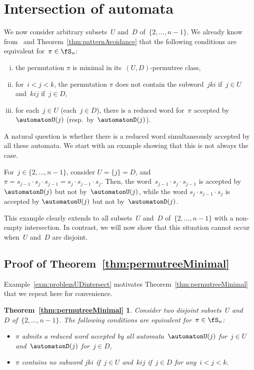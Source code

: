 \section{Intersection of automata}\label{sec:intersectionsAutomata}

We now consider arbitrary subsets~$U$ and~$D$ of~$\{2, \dots, n-1\}$.
We already know from~\cite{PilaudPons-permutrees} and Theorem~\ref{thm:patternAvoidance} that the following conditions are equivalent for~$\pi \in \fS_n$:
\begin{enumerate}[(i)]
	\item the permutation $\pi$ is minimal in its~$(U,D)$-permutree class, 
	\item for~$i < j < k$, the permutation $\pi$ does not contain the subword~$jki$ if~$j \in U$ and~$kij$ if~$j \in D$,
	\item for each~$j \in U$ (each~$j \in D$), there is a reduced word for~$\pi$ accepted by~$\automatonU(j)$ (resp.~by~$\automatonD(j)$).
\end{enumerate}
A natural question is whether there is a reduced word simultaneously accepted by all these automata.
We start with an example showing that this is not always the case.

\begin{example}\label{exm:problemUDintersect}
For~$j \in \{2, \dots, n-1\}$, consider $U = \{j\} = D$, and~$\pi = s_{j-1} \cdot s_j \cdot s_{j-1} = s_j \cdot s_{j-1} \cdot s_j$.
Then, the word~$s_{j-1} \cdot s_j \cdot s_{j-1}$ is accepted by $\automatonD(j)$ but not by~$\automatonU(j)$, while the word $s_j \cdot s_{j-1} \cdot s_j$ is accepted by $\automatonU(j)$ but not by~$\automatonD(j)$.
\end{example}

This example clearly extends to all subsets~$U$ and~$D$ of~$\{2, \dots, n-1\}$ with a non-empty intersection.
In contrast, we will now show that this situation cannot occur when~$U$ and~$D$ are disjoint.

\subsection{Proof of Theorem~\ref{thm:permutreeMinimal}}

Example~\ref{exm:problemUDintersect} motivates Theorem~\ref{thm:permutreeMinimal} that we repeat here for convenience.

\newtheorem*{thm:permutreeMinimal}{Theorem~\ref{thm:permutreeMinimal}}
\begin{thm:permutreeMinimal}
Consider two disjoint subsets~$U$ and~$D$ of~$\{2, \dots, n-1\}$.
The following conditions are equivalent for~$\pi \in \fS_n$:
\begin{itemize}
\item $\pi$ admits a reduced word accepted by all automata~$\automatonU(j)$ for~$j \in U$ and~$\automatonD(j)$ for~${j \in D}$,
\item $\pi$ contains no subword $jki$ if~$j \in U$ and~$kij$ if~$j \in D$ for any~$i < j < k$.
\end{itemize}
\end{thm:permutreeMinimal}

